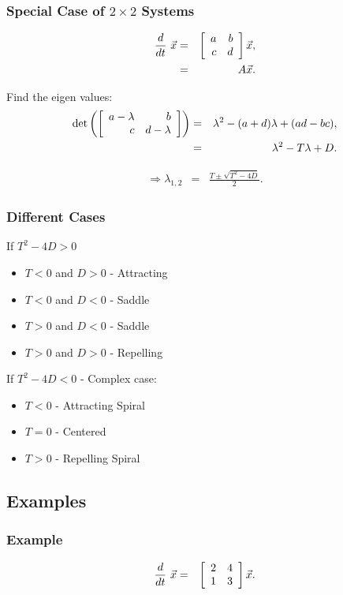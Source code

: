 \begin{frame}
  \frametitle{Special Case of $2\times 2$ Systems}

  \begin{eqnarray*}
    \deriv{~}{t} \vec{x} & = & \arrayTwo{a}{b}{c}{d} \vec{x}, \\
    & = & A \vec{x}.
  \end{eqnarray*}

  {
    Find the eigen values:
    \begin{eqnarray*}
      \det\lp\arrayTwo{a-\lambda}{b}{c}{d-\lambda}\rp & = & 
      \lambda^2 - (a+d) \lambda + (ad-bc), \\
      & = & \lambda^2 - T\lambda + D.
    \end{eqnarray*}
  }

  {
    \begin{eqnarray*}
      \Rightarrow \lambda_{1,2} & = & \frac{T\pm\sqrt{T^2-4D}}{2}.
    \end{eqnarray*}
  }


\end{frame}


\begin{frame}
  \frametitle{Different Cases}

  If $T^2-4D>0$
  \begin{itemize}
  \item $T<0$ and $D>0$ - Attracting
  \item $T<0$ and $D<0$ - Saddle
  \item $T>0$ and $D<0$ - Saddle
  \item $T>0$ and $D>0$ - Repelling
  \end{itemize}

  If $T^2-4D<0$ - Complex case:
  \begin{itemize}
  \item $T<0$ - Attracting Spiral
  \item $T=0$ - Centered
  \item $T>0$ - Repelling Spiral
  \end{itemize}


\end{frame}

\subsection{Examples}

\begin{frame}
  \frametitle{Example}

  \begin{eqnarray*}
    \deriv{~}{t} \vec{x} & = & \arrayTwo{2}{4}{1}{3} \vec{x}.
  \end{eqnarray*}

\end{frame}


